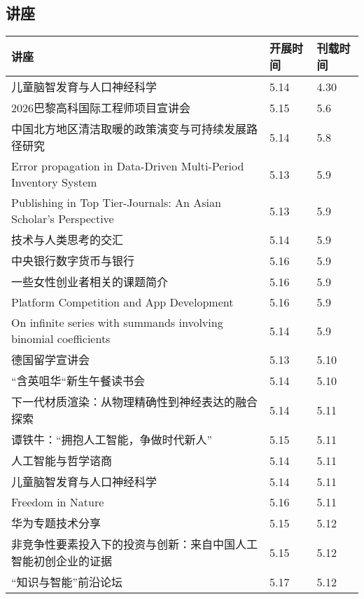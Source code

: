 \documentclass[letterpaper, 12pt]{article}
\begin{document}
\begin{multicols}{2}
\pagebreak

\section{讲座}
\begin{tabular}{|>{\centering\arraybackslash}m{}|m{}|m{}|}
    \hline
    讲座 & 开展时间 & 刊载时间\\
    \hline\hline
    儿童脑智发育与人口神经科学 & 5.14 & 4.30\\\hline
    2026巴黎高科国际工程师项目宣讲会 & 5.15 & 5.6\\\hline
    中国北方地区清洁取暖的政策演变与可持续发展路径研究 & 5.14 & 5.8\\\hline
    Error propagation in Data-Driven Multi-Period Inventory System & 5.13 & 5.9\\\hline
    Publishing in Top Tier-Journals: An Asian Scholar’s Perspective & 5.13 & 5.9\\\hline
    技术与人类思考的交汇 & 5.14 & 5.9\\\hline
    中央银行数字货币与银行 & 5.16 & 5.9\\\hline
    一些女性创业者相关的课题简介 & 5.16 & 5.9\\\hline
    Platform Competition and App Development & 5.16 & 5.9\\\hline
    On infinite series with summands involving binomial coefficients & 5.14 & 5.9\\\hline
    德国留学宣讲会 & 5.13 & 5.10\\\hline
    “含英咀华“新生午餐读书会 & 5.14 & 5.10\\\hline
    下一代材质渲染：从物理精确性到神经表达的融合探索 & 5.14 & 5.11\\\hline
    谭铁牛：“拥抱人工智能，争做时代新人” & 5.15 & 5.11\\\hline
    人工智能与哲学谘商 & 5.14 & 5.11\\\hline
    儿童脑智发育与人口神经科学 & 5.14 & 5.11\\\hline
    Freedom in Nature & 5.16 & 5.11\\\hline
    华为专题技术分享 & 5.15 & 5.12\\\hline
    非竞争性要素投入下的投资与创新：来自中国人工智能初创企业的证据 & 5.15 & 5.12\\\hline
    “知识与智能”前沿论坛 & 5.17 & 5.12\\\hline
    \end{tabular}

\end{multicols}
\end{document}
